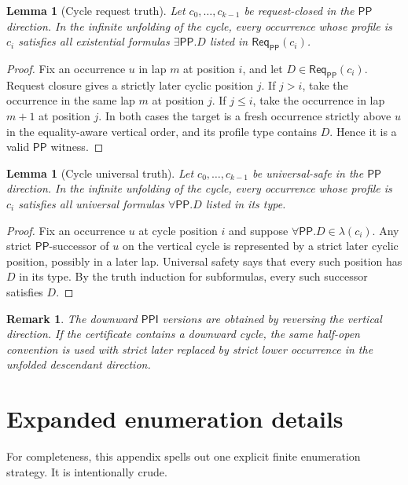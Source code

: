 \documentclass[11pt]{article}
\newtheorem{lemma}[theorem]{Lemma}
\newtheorem{remark}[theorem]{Remark}
\newcommand{\PP}{\mathsf{PP}}
\newcommand{\PPI}{\mathsf{PPI}}
\newcommand{\Req}{\mathsf{Req}}
\begin{document}
\begin{lemma}[Cycle request truth]
Let $c_0,\ldots,c_{k-1}$ be request-closed in the $\PP$ direction.  In the infinite unfolding of the cycle, every occurrence whose profile is $c_i$ satisfies all existential formulas $\exists\PP.D$ listed in $\Req_\PP(c_i)$.
\end{lemma}

\begin{proof}
Fix an occurrence $u$ in lap $m$ at position $i$, and let $D\in\Req_\PP(c_i)$.  Request closure gives a strictly later cyclic position $j$.  If $j>i$, take the occurrence in the same lap $m$ at position $j$.  If $j\le i$, take the occurrence in lap $m+1$ at position $j$.  In both cases the target is a fresh occurrence strictly above $u$ in the equality-aware vertical order, and its profile type contains $D$.  Hence it is a valid $\PP$ witness.
\end{proof}

\begin{lemma}[Cycle universal truth]
Let $c_0,\ldots,c_{k-1}$ be universal-safe in the $\PP$ direction.  In the infinite unfolding of the cycle, every occurrence whose profile is $c_i$ satisfies all universal formulas $\forall\PP.D$ listed in its type.
\end{lemma}

\begin{proof}
Fix an occurrence $u$ at cycle position $i$ and suppose $\forall\PP.D\in\lambda(c_i)$.  Any strict $\PP$-successor of $u$ on the vertical cycle is represented by a strict later cyclic position, possibly in a later lap.  Universal safety says that every such position has $D$ in its type.  By the truth induction for subformulas, every such successor satisfies $D$.
\end{proof}

\begin{remark}
The downward $\PPI$ versions are obtained by reversing the vertical direction.  If the certificate contains a downward cycle, the same half-open convention is used with strict later replaced by strict lower occurrence in the unfolded descendant direction.
\end{remark}

\section{Expanded enumeration details}

For completeness, this appendix spells out one explicit finite enumeration strategy.  It is intentionally crude.
\end{document}
